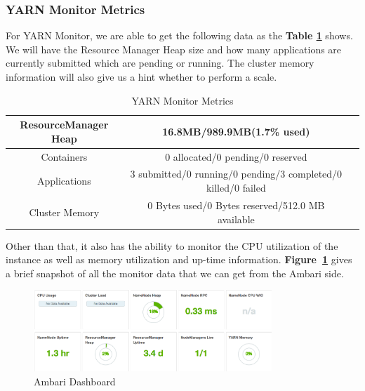 \documentclass{article}
\begin{document}
\subsubsection{YARN Monitor Metrics}
For YARN Monitor, we are able to get the following data as the \textbf{Table \ref{table:yarnMetrics}} shows. We will have the Resource Manager Heap size and how many applications are currently submitted which are pending or running. The cluster memory information will also give us a hint whether to perform a scale.
\begin{table}[ht!]
\begin{center}
\begin{tabular}{ |c|c|c| }
\hline
ResourceManager Heap & 16.8MB/989.9MB(1.7\% used) \\
\hline
Containers & 0 allocated/0 pending/0 reserved \\
\hline
Applications & {3 submitted/0 running/0 pending/3 completed/0 killed/0 failed}\\
\hline
Cluster Memory & {0 Bytes used/0 Bytes reserved/512.0 MB available}\\
\hline
\end{tabular}
\end{center}
\caption{YARN Monitor Metrics}
\label{table:yarnMetrics}
\end{table}

 Other than that, it also has the ability to monitor the CPU utilization of the instance as well as memory utilization and up-time information. \textbf{Figure~\ref{fig:ambariDashboard}} gives a brief snapshot of all the monitor data that we can get from the Ambari side.
\begin{figure}[ht!]
 \centering
  \includegraphics[width=0.8\textwidth,natwidth=1000,natheight=400]{fig4_2.png}
 \caption{Ambari Dashboard}
 \label{fig:ambariDashboard}
 \end{figure}
\end{document}
